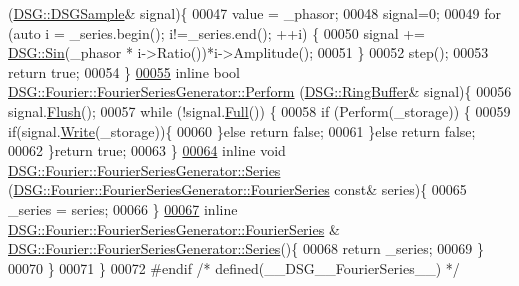 \begin{DoxyCode}
      (\hyperlink{namespace_d_s_g_ac39a94cd27ebcd9c1e7502d0c624894a}{DSG::DSGSample}& signal)\{
00047             value = \_phasor;
00048             signal=0;
00049             \textcolor{keywordflow}{for} (\textcolor{keyword}{auto} i = \_series.begin(); i!=\_series.end(); ++i) \{
00050                 signal += \hyperlink{namespace_d_s_g_aad63d316081c7d13a551acf346ee2749}{DSG::Sin}(\_phasor * i->Ratio())*i->Amplitude();
00051             \}
00052             step();
00053             \textcolor{keywordflow}{return} \textcolor{keyword}{true};
00054         \}
\hypertarget{_fourier_series_8h_source_l00055}{}\hyperlink{class_d_s_g_1_1_fourier_1_1_fourier_series_generator_adce79a239104570f8a6565e708fb70a7}{00055}         \textcolor{keyword}{inline} \textcolor{keywordtype}{bool} \hyperlink{class_d_s_g_1_1_fourier_1_1_fourier_series_generator_aa4768d44397b5fab5a30cb86068e161a}{DSG::Fourier::FourierSeriesGenerator::Perform}
      (\hyperlink{class_d_s_g_1_1_ring_buffer}{DSG::RingBuffer}& signal)\{
00056             signal.\hyperlink{class_d_s_g_1_1_ring_buffer_ab23c8003d2857809a816068eeb209d60}{Flush}();
00057             \textcolor{keywordflow}{while} (!signal.\hyperlink{class_d_s_g_1_1_ring_buffer_a53ddb04ffcbb5470a8d2b0a3c65b70cb}{Full}()) \{
00058                 \textcolor{keywordflow}{if} (Perform(\_storage)) \{
00059                     \textcolor{keywordflow}{if}(signal.\hyperlink{class_d_s_g_1_1_ring_buffer_aa5dd2caa0a270173251faee40a43d692}{Write}(\_storage))\{
00060                     \}\textcolor{keywordflow}{else} \textcolor{keywordflow}{return} \textcolor{keyword}{false};
00061                 \}\textcolor{keywordflow}{else} \textcolor{keywordflow}{return} \textcolor{keyword}{false};
00062             \}\textcolor{keywordflow}{return} \textcolor{keyword}{true};
00063         \}
\hypertarget{_fourier_series_8h_source_l00064}{}\hyperlink{class_d_s_g_1_1_fourier_1_1_fourier_series_generator_a69b6556f53c7241e37144f5d88381fb7}{00064}         \textcolor{keyword}{inline} \textcolor{keywordtype}{void} \hyperlink{class_d_s_g_1_1_fourier_1_1_fourier_series_generator_a4ed12eb61fe931ceceaeb59a2986a147}{DSG::Fourier::FourierSeriesGenerator::Series}
      (\hyperlink{class_d_s_g_1_1_fourier_1_1_fourier_series_generator_a32ffe02b67ac07db92ad41e3ee366c94}{DSG::Fourier::FourierSeriesGenerator::FourierSeries} \textcolor{keyword}{
      const}& series)\{
00065             \_series = series;
00066         \}
\hypertarget{_fourier_series_8h_source_l00067}{}\hyperlink{class_d_s_g_1_1_fourier_1_1_fourier_series_generator_a4ed12eb61fe931ceceaeb59a2986a147}{00067}         \textcolor{keyword}{inline} \hyperlink{class_d_s_g_1_1_fourier_1_1_fourier_series_generator_a32ffe02b67ac07db92ad41e3ee366c94}{DSG::Fourier::FourierSeriesGenerator::FourierSeries}
      & \hyperlink{class_d_s_g_1_1_fourier_1_1_fourier_series_generator_a4ed12eb61fe931ceceaeb59a2986a147}{DSG::Fourier::FourierSeriesGenerator::Series}()\{
00068             \textcolor{keywordflow}{return} \_series;
00069         \}
00070     \}
00071 \}
00072 \textcolor{preprocessor}{#endif }\textcolor{comment}{/* defined(\_\_DSG\_\_FourierSeries\_\_) */}\textcolor{preprocessor}{}
\end{DoxyCode}
